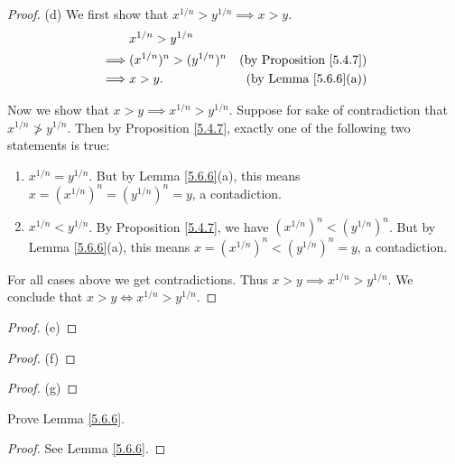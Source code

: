 \begin{proof}{(d)}
We first show that \(x^{1 / n} > y^{1 / n} \implies x > y\).
\begin{align*}
& x^{1 / n} > y^{1 / n} \\
\implies & (x^{1 / n})^n > (y^{1 / n})^n & \text{(by Proposition \ref{5.4.7})} \\
\implies & x > y. & \text{(by Lemma \ref{5.6.6}(a))}
\end{align*}

Now we show that \(x > y \implies x^{1 / n} > y^{1 / n}\).
Suppose for sake of contradiction that \(x^{1 / n} \not> y^{1 / n}\).
Then by Proposition \ref{5.4.7}, exactly one of the following two statements is true:
\begin{enumerate}[label=(\Roman*)]
    \item \(x^{1 / n} = y^{1 / n}\).
    But by Lemma \ref{5.6.6}(a), this means \(x = (x^{1 / n})^n = (y^{1 / n})^n = y\), a contadiction.
    \item \(x^{1 / n} < y^{1 / n}\).
    By Proposition \ref{5.4.7}, we have \((x^{1 / n})^n < (y^{1 / n})^n \).
    But by Lemma \ref{5.6.6}(a), this means \(x = (x^{1 / n})^n < (y^{1 / n})^n = y\), a contadiction.
\end{enumerate}
For all cases above we get contradictions.
Thus \(x > y \implies x^{1 / n} > y^{1 / n}\).
We conclude that \(x > y \iff x^{1 / n} > y^{1 / n}\).
\end{proof}

\begin{proof}{(e)}

\end{proof}

\begin{proof}{(f)}

\end{proof}

\begin{proof}{(g)}

\end{proof}

\exercisesection

\begin{exercise}\label{ex 5.6.1}
Prove Lemma \ref{5.6.6}.
\end{exercise}

\begin{proof}
See Lemma \ref{5.6.6}.
\end{proof}